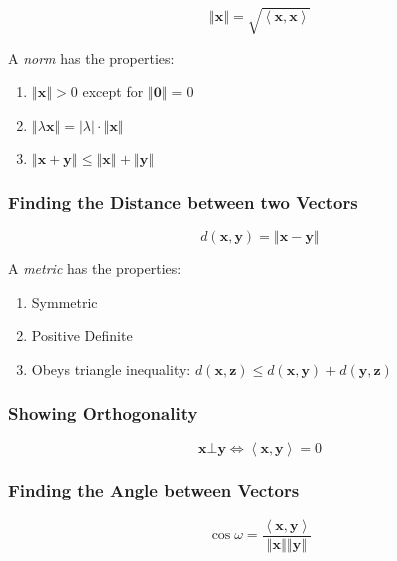 \documentclass[10pt,twoside,twocolumn]{article}
\begin{document}
\[
\left\Vert \mathbf{x}\right\Vert =\sqrt{\left\langle \mathbf{x},\mathbf{x}\right\rangle }
\]


A \emph{norm} has the properties: 
\begin{enumerate}
\item $\left\Vert \mathbf{x}\right\Vert >0$ except for $\left\Vert \mathbf{0}\right\Vert =0$ 
\item $\left\Vert \lambda\mathbf{x}\right\Vert =\left|\lambda\right|\cdot\left\Vert \mathbf{x}\right\Vert $ 
\item $\left\Vert \mathbf{x}+\mathbf{y}\right\Vert \leq\left\Vert \mathbf{x}\right\Vert +\left\Vert \mathbf{y}\right\Vert $ 
\end{enumerate}

\subsubsection{Finding the Distance between two Vectors}

\[
d\left(\mathbf{x},\mathbf{y}\right)=\left\Vert \mathbf{x}-\mathbf{y}\right\Vert 
\]


A \emph{metric} has the properties: 
\begin{enumerate}
\item Symmetric 
\item Positive Definite 
\item Obeys triangle inequality: $d\left(\mathbf{x},\mathbf{z}\right)\leq d\left(\mathbf{x},\mathbf{y}\right)+d\left(\mathbf{y},\mathbf{z}\right)$ 
\end{enumerate}

\subsubsection{Showing Orthogonality}

\[
\mathbf{x}\bot\mathbf{y}\iff\left\langle \mathbf{x},\mathbf{y}\right\rangle =0
\]



\subsubsection{Finding the Angle between Vectors}

\[
\cos\omega=\frac{\left\langle \mathbf{x},\mathbf{y}\right\rangle }{\left\Vert \mathbf{x}\right\Vert \left\Vert \mathbf{y}\right\Vert }
\]
\end{document}
